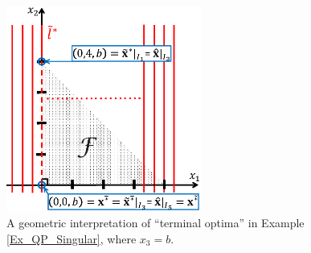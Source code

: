 \documentclass[9pt,twocolumn,twoside,lineno]{pnas-new-1}
\theoremstyle{remark}
\begin{document}
\begin{figure}[htbp]
    \begin{center}
    \includegraphics[width=6.4cm]{Fig_Ex_QP_Singular.eps}
    \caption{A geometric interpretation of ``terminal optima'' in Example {\rm\ref{Ex_QP_Singular}}, where $x_3=b$.}
    \label{Fig_Ex_QP_Singular}
    \end{center}
\end{figure}
\end{document}
